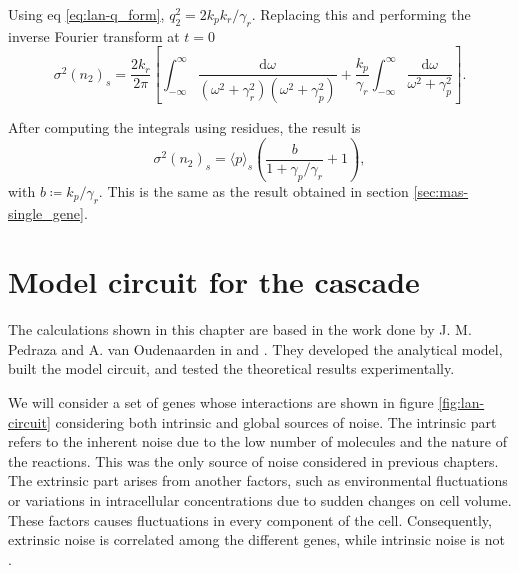 Using eq \eqref{eq:lan-q_form}, $q_2^2 = 2k_pk_r/\gamma_r$. Replacing this and performing the inverse Fourier transform at $t=0$
\begin{equation*}
  \sigma^2(n_2)_s = \frac{2k_r}{2\pi}\left[\int_{-\infty}^\infty\frac{\mathrm{d}\omega}{(\omega^2+\gamma_r^2)(\omega^2+\gamma_p^2)} + \frac{k_p}{\gamma_r}\int_{-\infty}^\infty \frac{\mathrm{d}\omega}{\omega^2+\gamma_p^2} \right].
\end{equation*}

After computing the integrals using residues, the result is
\begin{equation}
  \label{eq:lan-simple_varp}
  \sigma^2(n_2)_s = \langle p\rangle_s\left(\frac{b}{1+\gamma_p/\gamma_r}+1\right),
\end{equation}
with $b\coloneqq k_p/\gamma_r$. This is the same as the result obtained in section \ref{sec:mas-single_gene}.

\section{Model circuit for the cascade}

The calculations shown in this chapter are based in the work done by J. M. Pedraza and A. van Oudenaarden in \cite{pedraza05} and \cite{pedraza06}. They developed the analytical model, built the model circuit, and tested the theoretical results experimentally.

We will consider a set of genes whose interactions are shown in figure \ref{fig:lan-circuit} considering both intrinsic and global sources of noise. The intrinsic part refers to the inherent noise due to the low number of molecules and the nature of the reactions. This was the only source of noise considered in previous chapters. The extrinsic part arises from another factors, such as environmental fluctuations or variations in intracellular concentrations due to sudden changes on cell volume. These factors causes fluctuations in every component of the cell. Consequently, extrinsic noise is correlated among the different genes, while intrinsic noise is not \cite{elowitz02}.

